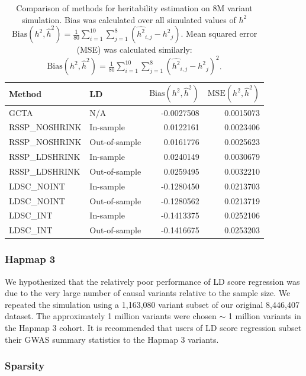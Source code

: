 \begin{table}
\begin{tabular}{l|l|r|r}
\hline
Method & LD & $\text{Bias}(h^2,\hat{h}^2)$ & $\text{MSE}(h^2,\hat{h}^2)$\\
\hline
GCTA & N/A & -0.0027508 & 0.0015073\\
\hline
RSSP\_NOSHRINK & In-sample & 0.0122161 & 0.0023406\\
\hline
RSSP\_NOSHRINK & Out-of-sample & 0.0161776 & 0.0025623\\
\hline
RSSP\_LDSHRINK & In-sample & 0.0240149 & 0.0030679\\
\hline
RSSP\_LDSHRINK & Out-of-sample & 0.0259495 & 0.0032210\\
\hline
LDSC\_NOINT & In-sample & -0.1280450 & 0.0213703\\
\hline
LDSC\_NOINT & Out-of-sample & -0.1280562 & 0.0213719\\
\hline
LDSC\_INT & In-sample & -0.1413375 & 0.0252106\\
\hline
LDSC\_INT & Out-of-sample & -0.1416675 & 0.0253203\\
\hline
\end{tabular}\label{tab:gwas_sim_ave_error}
\caption{Comparison of methods for heritability estimation on 8M variant simulation.  Bias was calculated over all simulated values of $h^2$ $\text{Bias}(h^2,\hat{h}^2)=\frac{1}{80}\sum_{i=1}^{10}\sum_{j=1}^{8}(\hat{h^2}_{i,j}-{h^2}_j)$.   Mean squared error (MSE) was calculated similarly: $\text{Bias}(h^2,\hat{h}^2)=\frac{1}{80}\sum_{i=1}^{10}\sum_{j=1}^{8}{(\hat{h^2}_{i,j}-{h^2}_j)}^2$.}
\end{table}

\subsubsection{Hapmap 3}\label{sec:org0fa2c7f}

We hypothesized that the relatively poor performance of LD score regression was due to the very large number of causal variants relative to the sample size.  We repeated the simulation using a 1,163,080 variant subset of our original 8,446,407 dataset.  The approximately 1 million variants were chosen  $\sim$ 1 million variants in the Hapmap 3 cohort.  It is recommended that users of LD score regression subset their GWAS summary statistics to the Hapmap 3 variants.

\subsubsection{Sparsity}

